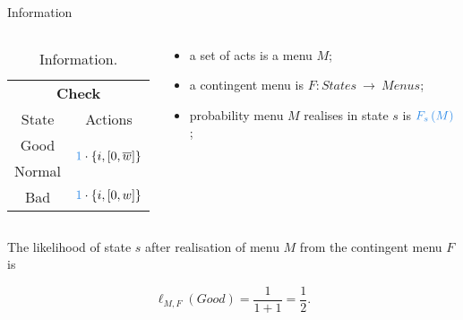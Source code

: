 \documentclass[usenames,dvipsnames,aspectratio=169,11pt, envcountsect, handout]{beamer}
\begin{document}
\begin{frame}{Information}

	\begin{columns}
		\begin{column}{0.35\textwidth} %
			\begin{center}
				\begin{table}
					\centering
					\begin{tabular}{c | c}
						\multicolumn{2}{c}{\textbf{Check}}                                                                           \\
						State  & Actions                                                                                             \\
						\hline
						Good   & \multirow{2}{*}{\( \textcolor{blue}{1} \cdot \left\{ i, \left[ 0, \overline{w} \right] \right\} \)} \\
						Normal &                                                                                                     \\
						Bad    & \( \textcolor{blue}{1} \cdot \left\{ i, \left[0, w \right] \right\}\)                               \\
					\end{tabular}
					\caption{Information.}
					\label{tab:info2}
				\end{table}
			\end{center}
		\end{column}

		\begin{column}{0.65\textwidth} %
			\begin{itemize}
				\item a set of acts is a menu \( M  \);
				\item a contingent menu is \(F: States \: \rightarrow \: Menus \);
				\item probability menu \( M \) realises in state \( s \) is \( \textcolor{blue}{F_s \left( M \right)} \); \pause
			\end{itemize}
		\end{column}
	\end{columns}

	\vfill

	The likelihood of state \(s\) after realisation of menu \(M\) from the contingent menu \(F\) is

	\vfill

	\[ \ell_{M, F} \left( Good \right) = \frac{1}{1+1} = \frac{1}{2} .
	\]

\end{frame}
\end{document}
